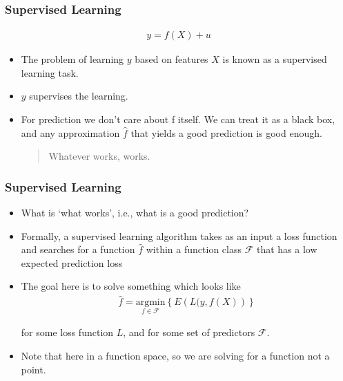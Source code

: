 \documentclass[
  shownotes,
  xcolor={svgnames},
  hyperref={colorlinks,citecolor=DarkBlue,linkcolor=DarkRed,urlcolor=DarkBlue}
  , aspectratio=169]{beamer}
\begin{document}
\begin{frame}[fragile]
\frametitle{Supervised Learning}

\begin{align}
    y = f(X)  + u
    \end{align}

\begin{itemize}
\item The problem of learning $y$ based on features $X$ is known as a supervised learning task.
\medskip
\item $y$ supervises the learning.

\item For prediction we don’t care about f itself. We can treat it as a black box, and any approximation $\hat f$ that yields a good prediction is good enough.

\bigskip

\begin{quote}
\centering
Whatever works, works.
\end{quote}


\end{itemize}

\end{frame}
\begin{frame}[fragile]
\frametitle{Supervised Learning}

\begin{itemize}
\item What is ‘what works’, i.e., what is a good prediction?
\medskip
\item  Formally, a supervised learning algorithm takes as an input a loss function and searches for a function $\hat{f}$ within a function class $\mathcal{F}$ that has a low expected prediction loss
\medskip

\item The goal here is to solve something which looks like
\begin{align}
\hat{f}=\underset{f\in\mathcal{F}}{\text{argmin}}\left\lbrace E \left(L(y,f(X) \right) \right\rbrace
\end{align}
\medskip

for some loss function $L$, and for some set of predictors $\mathcal{F}$. 
\medskip
\item Note that here in a function space, so we are solving for a function not a point.



\end{itemize} 

\end{frame}
\end{document}
